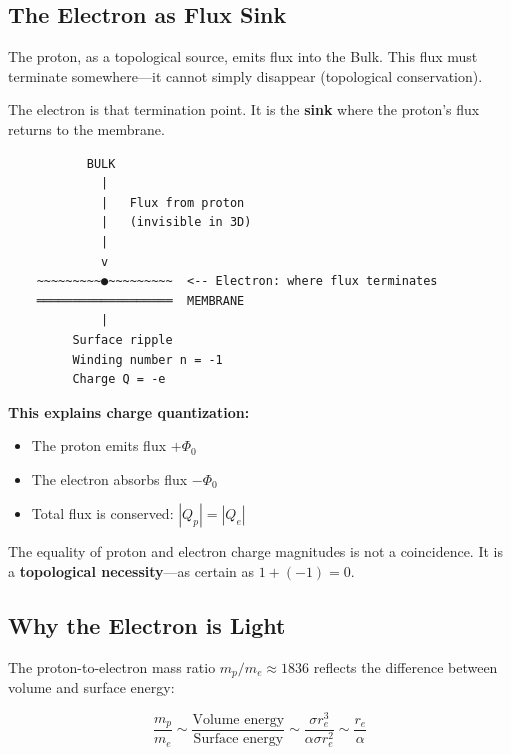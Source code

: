 \subsection{The Electron as Flux Sink}
\label{subsec:flux_sink}

The proton, as a topological source, emits flux into the Bulk. This flux must terminate somewhere---it cannot simply disappear (topological conservation).

The electron is that termination point. It is the \textbf{sink} where the proton's flux returns to the membrane.

\begin{tcolorbox}[colback=yellow!5,colframe=orange!70,title=\textbf{The Electron's True Nature}]
\begin{verbatim}
           BULK
             |
             |   Flux from proton
             |   (invisible in 3D)
             |
             v
    ~~~~~~~~~●~~~~~~~~~  <-- Electron: where flux terminates
    ═══════════════════  MEMBRANE
             |
         Surface ripple
         Winding number n = -1
         Charge Q = -e
\end{verbatim}
\end{tcolorbox}

\textbf{This explains charge quantization:}
\begin{itemize}
    \item The proton emits flux $+\Phi_0$
    \item The electron absorbs flux $-\Phi_0$
    \item Total flux is conserved: $|Q_p| = |Q_e|$
\end{itemize}

The equality of proton and electron charge magnitudes is not a coincidence. It is a \textbf{topological necessity}---as certain as $1 + (-1) = 0$.

\subsection{Why the Electron is Light}
\label{subsec:electron_mass}

The proton-to-electron mass ratio $m_p/m_e \approx 1836$ reflects the difference between volume and surface energy:

\begin{equation}
\frac{m_p}{m_e} \sim \frac{\text{Volume energy}}{\text{Surface energy}} \sim \frac{\sigma r_e^3}{\alpha \sigma r_e^2} \sim \frac{r_e}{\alpha}
\end{equation}


